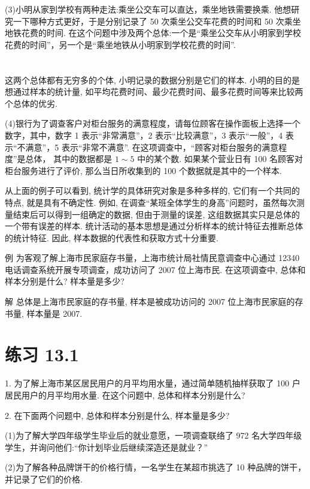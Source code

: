 \documentclass[10pt]{article}
\begin{document}
(3)小明从家到学校有两种走法:乘坐公交车可以直达，乘坐地铁需要换乘. 他想研究一下哪种方式更好，于是分别记录了 50 次乘坐公交车花费的时间和 50 次乘坐地铁花费的时间. 在这个问题中涉及两个总体:一个是“乘坐公交车从小明家到学校花费的时间”，另一个是“乘坐地铁从小明家到学校花费的时间”.

\section*{}

这两个总体都有无穷多的个体, 小明记录的数据分别是它们的样本. 小明的目的是想通过样本的统计量, 如平均花费时间、最少花费时间、最多花费时间等来比较两个总体的优劣.

(4)银行为了调查客户对柜台服务的满意程度，请每位顾客在操作面板上选择一个数字，其中，数字 1 表示“非常满意”，2 表示“比较满意”，3 表示“一般”，4 表示“不满意”，5 表示“非常不满意”. 在这项调查中，“顾客对柜台服务的满意程度”是总体， 其中的数据都是 \(1 \sim  5\) 中的某个数. 如果某个营业日有 100 名顾客对柜台服务进行了评价, 那么当日所收集到的 100 个数据就是其中的一个样本.

从上面的例子可以看到, 统计学的具体研究对象是多种多样的, 它们有一个共同的特点, 就是具有不确定性. 例如, 在调查“某班全体学生的身高”问题时，虽然每次测量结束后可以得到一组确定的数据, 但由于测量的误差, 这组数据其实只是总体的一个带有误差的样本. 统计活动的基本思想是通过分析样本的统计特征去推断总体的统计特征. 因此, 样本数据的代表性和获取方式十分重要.

例 为客观了解上海市民家庭存书量，上海市统计局社情民意调查中心通过 12340 电话调查系统开展专项调查，成功访问了 2007 位上海市民. 在这项调查中, 总体和样本分别是什么? 样本量是多少?

解 总体是上海市民家庭的存书量, 样本是被成功访问的 2007 位上海市民家庭的存书量, 样本量是 2007.

\section*{练习 13.1}

1. 为了解上海市某区居民用户的月平均用水量，通过简单随机抽样获取了 100 户居民用户的月平均用水量. 在这个问题中, 总体和样本分别是什么?

2. 在下面两个问题中, 总体和样本分别是什么, 样本量是多少?

(1)为了解大学四年级学生毕业后的就业意愿，一项调查联络了 972 名大学四年级学生，并询问他们:“你计划毕业后继续深造还是就业？”

(2)为了解各种品牌饼干的价格行情，一名学生在某超市挑选了 10 种品牌的饼干， 并记录了它们的价格.
\end{document}
